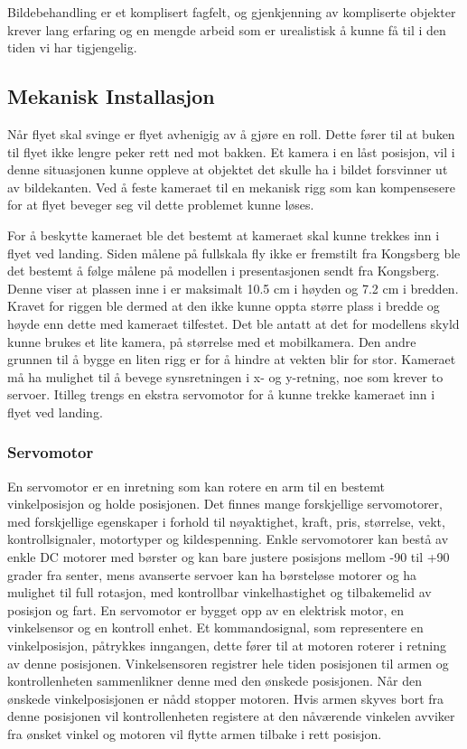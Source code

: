 Bildebehandling er et komplisert fagfelt, og gjenkjenning av kompliserte objekter krever lang erfaring og en mengde arbeid som er urealistisk å kunne få til i den tiden vi har tigjengelig.

\subsection{Mekanisk Installasjon}
Når flyet skal svinge er flyet avhenigig av å gjøre en roll.
Dette fører til at buken til flyet ikke lengre peker rett ned mot bakken.
Et kamera i en låst posisjon, vil i denne situasjonen kunne oppleve at
objektet det skulle ha i bildet forsvinner ut av bildekanten.
Ved å feste kameraet til en mekanisk rigg som kan kompensesere for at flyet beveger
seg vil dette problemet kunne løses.

For å beskytte kameraet ble det bestemt at kameraet skal kunne
trekkes inn i flyet ved landing.
Siden målene på fullskala fly ikke er fremstilt fra Kongsberg ble det
bestemt å følge målene på modellen i presentasjonen sendt fra Kongsberg.
Denne viser at plassen inne i er maksimalt 10.5 cm i høyden og 7.2 cm i bredden.
Kravet for riggen ble dermed at den ikke kunne oppta større plass i bredde
og høyde enn dette med kameraet tilfestet.
Det ble antatt at det for modellens skyld kunne brukes et lite kamera,
på størrelse med et mobilkamera. Den andre grunnen til å bygge en liten rigg
er for å hindre at vekten blir for stor.
Kameraet må ha mulighet til å bevege synsretningen i x- og y-retning, noe som krever to servoer. Itilleg trengs en ekstra servomotor for å kunne trekke kameraet inn i flyet ved landing.

\subsubsection{Servomotor}
En servomotor er en inretning som kan rotere en arm til en bestemt vinkelposisjon og holde posisjonen.
Det finnes mange forskjellige servomotorer, med forskjellige egenskaper i forhold til nøyaktighet, kraft, pris, størrelse, vekt, kontrollsignaler, motortyper og kildespenning. 
Enkle servomotorer kan bestå av enkle DC motorer med børster og kan bare justere posisjons mellom -90 til +90 grader fra senter, mens avanserte servoer kan ha børsteløse motorer og ha mulighet til full rotasjon, med kontrollbar vinkelhastighet og tilbakemelid av posisjon og fart. 
En servomotor er bygget opp av en elektrisk motor, en vinkelsensor og en kontroll enhet.
Et kommandosignal, som representere en vinkelposisjon, påtrykkes inngangen, dette fører til at motoren roterer i retning av denne posisjonen. Vinkelsensoren registrer hele tiden posisjonen til armen og kontrollenheten sammenlikner denne med den ønskede posisjonen. Når den ønskede vinkelposisjonen er nådd stopper motoren. Hvis armen skyves bort fra denne posisjonen vil kontrollenheten registere at den nåværende vinkelen avviker fra ønsket vinkel og motoren vil flytte armen tilbake i rett posisjon.

